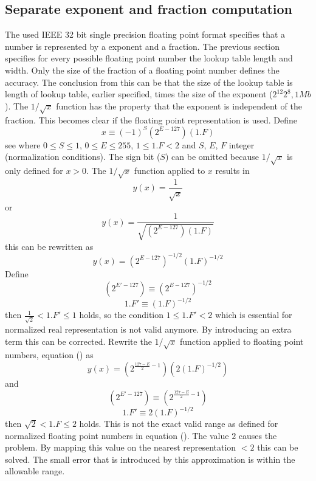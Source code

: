 \subsection{Separate exponent and fraction computation}
The used IEEE 32 bit single precision floating point format specifies
that a number is represented by a exponent and a fraction. The previous 
section specifies for every possible floating point number the lookup table 
length and width. Only the size of the fraction of a floating point number 
defines the accuracy. The conclusion from this can be that the size of the 
lookup table is length of lookup table, earlier specified, times the size of 
the exponent ($2^{12}2^{8}, 1Mb$). The $1/\sqrt{x}$  function has the 
property that the exponent is independent of the fraction. This becomes clear 
if the floating point representation is used. Define
\begin{equation}
x \equiv (-1)^{S}(2^{E-127})(1.F)
\label{eqn:fpdef}
\end{equation}
see  where $0 \leq S \leq 1$, $0 \leq E \leq 255$,
$1 \leq 1.F < 2$ and $S$, $E$, $F$ integer (normalization conditions). 
The sign bit ($S$) can be omitted because $1/\sqrt{x}$ is only defined 
for $x > 0$. The $1/\sqrt{x}$ function applied to $x$ results in
\begin{equation}
y(x) = \frac{1}{\sqrt{x}}
\end{equation}
or
\begin{equation}
y(x) = \frac{1}{\sqrt{(2^{E-127})(1.F)}}
\end{equation}
this can be rewritten as
\begin{equation}
y(x) = (2^{E-127})^{-1/2}(1.F)^{-1/2}
\label{eqn:yx}
\end{equation}
Define
\begin{equation}
(2^{E'-127}) \equiv (2^{E-127})^{-1/2}
\end{equation}
\begin{equation}
1.F'\equiv (1.F)^{-1/2}
\end{equation}
then $\frac{1}{\sqrt{2}} < 1.F' \leq 1$ holds, so the condition
$1 \leq 1.F' < 2$ which is essential for normalized real representation is
not valid anymore. By introducing an extra term this can be corrected.
Rewrite the $1/\sqrt{x}$ function applied to floating point numbers, equation
() as
\begin{equation}
y(x) = (2^{\frac{127-E}{2}-1}) (2(1.F)^{-1/2})
\end{equation}
and
\begin{equation}
(2^{E'-127}) \equiv (2^{\frac{127-E}{2}-1})
\label{eqn:exp}
\end{equation}
\begin{equation}
1.F'\equiv 2(1.F)^{-1/2}
\label{eqn:frac}
\end{equation}
then $\sqrt{2} < 1.F \leq 2$ holds. This is not the exact valid range as
defined for normalized floating point numbers in equation (). 
The value $2$  causes the problem. By mapping this value on the nearest
representation $< 2$ this can be solved. The small error that is introduced
by this approximation is within the allowable range. 

